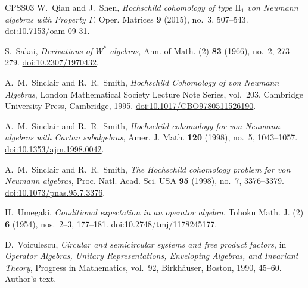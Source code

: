 \begin{thebibliography}{CPSS03}
W.~Qian and J.~Shen,
\emph{Hochschild cohomology of type $\mathrm{II}_1$ von Neumann
algebras with Property $\Gamma$},
Oper. Matrices \textbf{9} (2015), no.~3, 507--543.
\href{https://doi.org/10.7153/oam-09-31}{doi:10.7153/oam-09-31}.

S.~Sakai,
\emph{Derivations of $W^*$-algebras},
Ann. of Math. (2) \textbf{83} (1966), no.~2, 273--279.
\href{https://doi.org/10.2307/1970432}{doi:10.2307/1970432}.

A.~M.~Sinclair and R.~R.~Smith,
\emph{Hochschild Cohomology of von Neumann Algebras},
London Mathematical Society Lecture Note Series, vol.~203,
Cambridge University Press, Cambridge, 1995.
\href{https://doi.org/10.1017/CBO9780511526190}{doi:10.1017/CBO9780511526190}.

A.~M.~Sinclair and R.~R.~Smith,
\emph{Hochschild cohomology for von Neumann algebras with Cartan subalgebras},
Amer. J. Math. \textbf{120} (1998), no.~5, 1043--1057.
\href{https://doi.org/10.1353/ajm.1998.0042}{doi:10.1353/ajm.1998.0042}.

A.~M.~Sinclair and R.~R.~Smith,
\emph{The Hochschild cohomology problem for von Neumann algebras},
Proc. Natl. Acad. Sci. USA \textbf{95} (1998), no.~7, 3376--3379.
\href{https://doi.org/10.1073/pnas.95.7.3376}{doi:10.1073/pnas.95.7.3376}.

H.~Umegaki,
\emph{Conditional expectation in an operator algebra},
Tohoku Math. J. (2) \textbf{6} (1954), nos.~2--3, 177--181.
\href{https://doi.org/10.2748/tmj/1178245177}{doi:10.2748/tmj/1178245177}.

D.~Voiculescu,
\emph{Circular and semicircular systems and free product factors},
in \emph{Operator Algebras, Unitary Representations, Enveloping
Algebras, and Invariant Theory},
Progress in Mathematics, vol.~92, Birkh\"auser, Boston, 1990, 45--60.
\href{https://math.berkeley.edu/~dvv/CircularSemi.pdf}{Author's text}.

\end{thebibliography}
